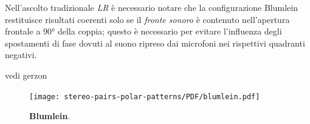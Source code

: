 Nell'ascolto tradizionale \emph{LR} è necessario notare che la configurazione
Blumlein restituisce risultati coerenti solo se il \emph{fronte sonoro} è contenuto
nell’apertura frontale a $90°$ della coppia; questo è necessario per evitare
l’influenza degli spostamenti di fase dovuti al suono ripreso dai microfoni
nei rispettivi quadranti negativi.

vedi gerzon
\begin{figure}[h]
\begin{center}
\texttt{[image: stereo-pairs-polar-patterns/PDF/blumlein.pdf]}
\caption{\textbf{Blumlein}.}
\label{blumlein}
\end{center}
\end{figure}
%
%
